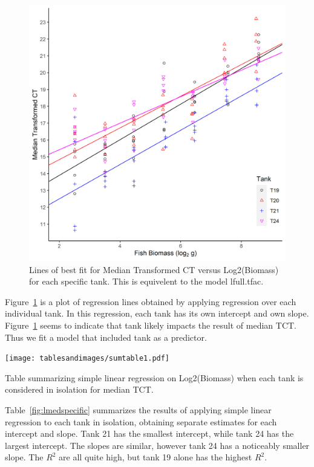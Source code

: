 \begin{figure}[H]
\includegraphics{Chapter3Images/ggplotnew2.png}
\caption{ \hspace{1mm}Lines of best fit for Median Transformed CT versus Log2(Biomass) for each specific tank. This is equivelent to the model lfull.tfac.}
\label{fig:medct33}
\end{figure}

Figure~\ref{fig:medct33} is a plot of regression lines obtained by applying regression over each individual tank. In this regression, each tank has its own intercept and own slope. Figure~\ref{fig:medct33} seems to indicate that tank likely impacts the result of median TCT. Thus we fit a model that included tank as a predictor. 



\begin{table}[H]
\texttt{[image: tablesandimages/sumtable1.pdf]}
\caption{\hspace{1mm}Table summarizing simple linear regression on Log2(Biomass) when each tank is considered in isolation for median TCT.}
\label{fig:lmedspecific}
\end{table}



Table~\ref{fig:lmedspecific} summarizes the results of applying simple linear regression to each tank in isolation, obtaining separate estimates for each intercept and slope. Tank 21 has the smallest intercept, while tank 24 has the largest intercept. The slopes are similar, however tank 24 has a noticeably smaller slope. The $R^{2}$ are all quite high, but tank 19 alone has the highest $R^{2}$. 



